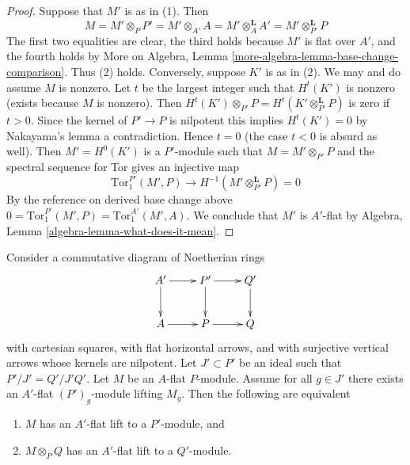 \begin{proof}
Suppose that $M'$ is as in (1). Then
$$
M = M' \otimes_P P' = M' \otimes_{A'} A =
M' \otimes_A^\mathbf{L} A' = M' \otimes_{P'}^\mathbf{L} P
$$
The first two equalities are clear, the third holds because
$M'$ is flat over $A'$, and the fourth holds by
More on Algebra, Lemma \ref{more-algebra-lemma-base-change-comparison}.
Thus (2) holds. Conversely, suppose $K'$ is as in (2).
We may and do assume $M$ is nonzero.
Let $t$ be the largest integer such that $H^t(K')$ is nonzero
(exists because $M$ is nonzero).
Then $H^t(K') \otimes_{P'} P = H^t(K' \otimes_{P'}^\mathbf{L} P)$
is zero if $t > 0$. Since the kernel of $P' \to P$ is nilpotent
this implies $H^t(K') = 0$ by Nakayama's lemma a contradiction.
Hence $t = 0$ (the case $t < 0$ is absurd as well).
Then $M' = H^0(K')$ is a $P'$-module such that $M = M' \otimes_{P'} P$
and the spectral sequence for Tor gives an injective map
$$
\text{Tor}_1^{P'}(M', P) \to H^{-1}(M' \otimes_{P'}^\mathbf{L} P) = 0
$$
By the reference on derived base change above
$0 = \text{Tor}_1^{P'}(M', P) = \text{Tor}_1^{A'}(M', A)$.
We conclude that $M'$ is $A'$-flat by
Algebra, Lemma \ref{algebra-lemma-what-does-it-mean}.
\end{proof}

\begin{lemma}
\label{lemma-lift-equivalence-module}
Consider a commutative diagram of Noetherian rings
$$
\xymatrix{
A' \ar[d] \ar[r] &
P' \ar[d] \ar[r] &
Q' \ar[d] \\
A \ar[r] &
P \ar[r] &
Q
}
$$
with cartesian squares, with flat horizontal arrows, and with
surjective vertical arrows whose kernels are nilpotent.
Let $J' \subset P'$ be an ideal such that $P'/J' = Q'/J'Q'$.
Let $M$ be an $A$-flat $P$-module.
Assume for all $g \in J'$ there exists an $A'$-flat $(P')_g$-module
lifting $M_g$. Then the following are equivalent
\begin{enumerate}
\item $M$ has an $A'$-flat lift to a $P'$-module, and
\item $M \otimes_P Q$ has an $A'$-flat lift to a $Q'$-module.
\end{enumerate}
\end{lemma}

